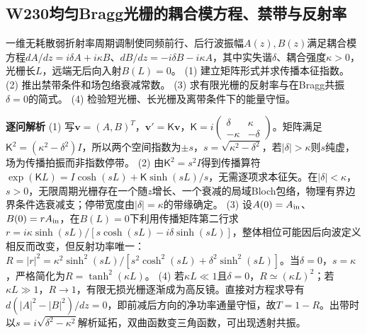 \subsection*{W230\quad 均匀Bragg光栅的耦合模方程、禁带与反射率}
一维无耗散弱折射率周期调制使同频前行、后行波振幅$A(z),B(z)$满足耦合模方程$dA/dz=i\delta A+i\kappa B$、$dB/dz=-i\delta B-i\kappa A$，其中实失谐$\delta$、耦合强度$\kappa>0$，光栅长$L$，远端无后向入射$B(L)=0$。
(1) 建立矩阵形式并求传播本征指数。
(2) 推出禁带条件和场包络衰减常数。
(3) 求有限光栅的反射率与在Bragg共振$\delta=0$的简式。
(4) 检验短光栅、长光栅及离带条件下的能量守恒。
\par\textbf{逐问解析}
(1) 写$\boldsymbol v=(A,B)^T$，$\boldsymbol v'=\mathsf K\boldsymbol v$，$\mathsf K=i\begin{pmatrix}\delta&\kappa\\-\kappa&-\delta\end{pmatrix}$。矩阵满足$\mathsf K^2=(\kappa^2-\delta^2)I$，所以两个空间指数为$\pm s$，$s=\sqrt{\kappa^2-\delta^2}$，若$|\delta|>\kappa$则$s$纯虚，场为传播拍振而非指数停带。
(2) 由$\mathsf K^2=s^2I$得到传播算符$\exp(\mathsf KL)=I\cosh(sL)+\mathsf K\sinh(sL)/s$，无需逐项求本征矢。在$|\delta|<\kappa$，$s>0$，无限周期光栅存在一个随$z$增长、一个衰减的局域Bloch包络，物理有界边界条件选衰减支；停带宽度由$|\delta|=\kappa$的带缘确定。
(3) 设$A(0)=A_{\rm in}$、$B(0)=rA_{\rm in}$，在$B(L)=0$下利用传播矩阵第二行求$r=i\kappa\sinh(sL)/[s\cosh(sL)-i\delta\sinh(sL)]$，整体相位可能因后向波定义相反而改变，但反射功率唯一：$R=|r|^2=\kappa^2\sinh^2(sL)/[s^2\cosh^2(sL)+\delta^2\sinh^2(sL)]$。当$\delta=0$，$s=\kappa$，严格简化为$R=\tanh^2(\kappa L)$。
(4) 若$\kappa L\ll1$且$\delta=0$，$R\simeq(\kappa L)^2$；若$\kappa L\gg1$，$R\to1$，有限无损光栅逐渐成为高反镜。直接对方程求导有$d(|A|^2-|B|^2)/dz=0$，即前减后方向的净功率通量守恒，故$T=1-R$。出带时以$s=i\sqrt{\delta^2-\kappa^2}$解析延拓，双曲函数变三角函数，可出现透射共振。
\par\medskip
